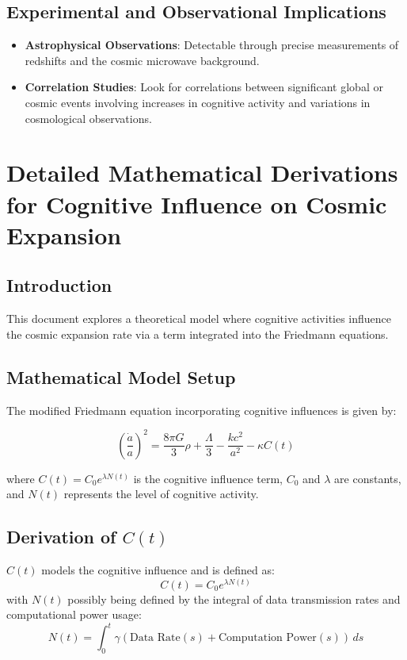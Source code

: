 \documentclass{article}
\begin{document}
\subsection{Experimental and Observational Implications}
\begin{itemize}
    \item \textbf{Astrophysical Observations}: Detectable through precise measurements of redshifts and the cosmic microwave background.
    \item \textbf{Correlation Studies}: Look for correlations between significant global or cosmic events involving increases in cognitive activity and variations in cosmological observations.
\end{itemize}
\section{Detailed Mathematical Derivations for Cognitive Influence on Cosmic Expansion}

\subsection{Introduction}
This document explores a theoretical model where cognitive activities influence the cosmic expansion rate via a term integrated into the Friedmann equations.

\subsection{Mathematical Model Setup}
The modified Friedmann equation incorporating cognitive influences is given by:

\begin{equation}
\left(\frac{\dot{a}}{a}\right)^2 = \frac{8\pi G}{3}\rho + \frac{\Lambda}{3} - \frac{kc^2}{a^2} - \kappa C(t)
\end{equation}

where \( C(t) = C_0 e^{\lambda N(t)} \) is the cognitive influence term, \( C_0 \) and \( \lambda \) are constants, and \( N(t) \) represents the level of cognitive activity.

\subsection{Derivation of \( C(t) \)}
\( C(t) \) models the cognitive influence and is defined as:
\begin{equation}
C(t) = C_0 e^{\lambda N(t)}
\end{equation}
with \( N(t) \) possibly being defined by the integral of data transmission rates and computational power usage:
\begin{equation}
N(t) = \int_{0}^{t} \gamma (\text{Data Rate}(s) + \text{Computation Power}(s)) \, ds
\end{equation}
\end{document}
